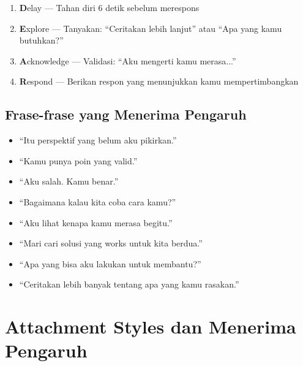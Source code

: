 \begin{praktikbox}
\begin{enumerate}[leftmargin=*]
    \item \textbf{D}elay --- Tahan diri 6 detik sebelum merespons
    \item \textbf{E}xplore --- Tanyakan: ``Ceritakan lebih lanjut'' atau ``Apa yang kamu butuhkan?''
    \item \textbf{A}cknowledge --- Validasi: ``Aku mengerti kamu merasa...''
    \item \textbf{R}espond --- Berikan respon yang menunjukkan kamu mempertimbangkan
\end{enumerate}
\end{praktikbox}

\subsection{Frase-frase yang Menerima Pengaruh}

\begin{tipbox}
\begin{itemize}
    \item ``Itu perspektif yang belum aku pikirkan.''
    \item ``Kamu punya poin yang valid.''
    \item ``Aku salah. Kamu benar.''
    \item ``Bagaimana kalau kita coba cara kamu?''
    \item ``Aku lihat kenapa kamu merasa begitu.''
    \item ``Mari cari solusi yang works untuk kita berdua.''
    \item ``Apa yang bisa aku lakukan untuk membantu?''
    \item ``Ceritakan lebih banyak tentang apa yang kamu rasakan.''
\end{itemize}
\end{tipbox}

\section{Attachment Styles dan Menerima Pengaruh}

